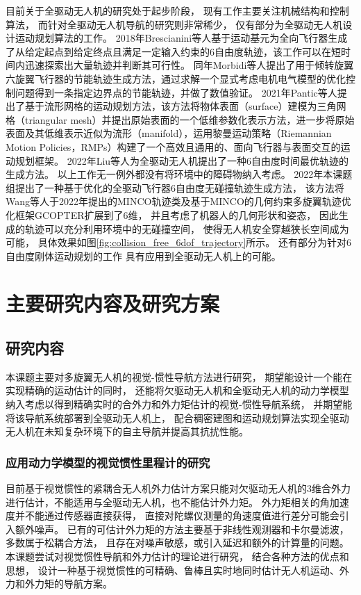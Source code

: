 目前关于全驱动无人机的研究处于起步阶段，
现有工作主要关注机械结构和控制算法，
而针对全驱动无人机导航的研究则非常稀少，
仅有部分为全驱动无人机设计运动规划算法的工作。
2018年Brescianini等人基于运动基元为全向飞行器生成了从给定起点到给定终点且满足一定输入约束的6自由度轨迹\cite{brescianini2018computationally}，该工作可以在短时间内迅速探索出大量轨迹并判断其可行性。
同年Morbidi等人提出了用于倾转旋翼六旋翼飞行器的节能轨迹生成方法\cite{morbidi2018energy}，通过求解一个显式考虑电机电气模型的优化控制问题得到一条指定边界点的节能轨迹，并做了数值验证。
2021年Pantic等人提出了基于流形网格的运动规划方法\cite{pantic2021mesh}，该方法将物体表面（surface）建模为三角网格（triangular mesh）并提出原始表面的一个低维参数化表示方法，进一步将原始表面及其低维表示近似为流形（manifold），运用黎曼运动策略（Riemannian Motion Policies，RMPs）构建了一个高效且通用的、面向飞行器与表面交互的运动规划框架。
2022年Liu等人为全驱动无人机提出了一种6自由度时间最优轨迹的生成方法\cite{liu2022optimal}。
以上工作无一例外都没有将环境中的障碍物纳入考虑。
2022年本课题组提出了一种基于优化的全驱动飞行器6自由度无碰撞轨迹生成方法\cite{liu2022collision}，
该方法将Wang等人于2022年提出的MINCO轨迹类及基于MINCO的几何约束多旋翼轨迹优化框架GCOPTER\cite{wang2022geometrically}扩展到了6维，
并且考虑了机器人的几何形状和姿态，
因此生成的轨迹可以充分利用环境中的无碰撞空间，
使得无人机安全穿越狭长空间成为可能，
具体效果如图\ref{fig:collision_free_6dof_trajectory}所示。
还有部分为针对6自由度刚体运动规划的工作
\cite{nguyen2016time, belta2002svd, belta2002euclidean, bestaoui2003motion, zefran1998generation, watterson2016smooth, jackson2021planning}
具有应用到全驱动无人机上的可能。

\section{主要研究内容及研究方案}
\subsection{研究内容}
本课题主要对多旋翼无人机的视觉-惯性导航方法进行研究，
期望能设计一个能在实现精确的运动估计的同时，
还能将欠驱动无人机和全驱动无人机的动力学模型纳入考虑以得到精确实时的合外力和外力矩估计的视觉-惯性导航系统，
并期望能将该导航系统部署到全驱动无人机上，
配合稠密建图和运动规划算法实现全驱动无人机在未知复杂环境下的自主导航并提高其抗扰性能。

\subsubsection{应用动力学模型的视觉惯性里程计的研究}
目前基于视觉惯性的紧耦合无人机外力估计方案只能对欠驱动无人机的3维合外力进行估计，不能适用与全驱动无人机，也不能估计外力矩。
外力矩相关的角加速度并不能通过传感器直接获得，
直接对陀螺仪测量的角速度值进行差分可能会引入额外噪声\cite{邱国鹏2023应用视觉}。
已有的可估计外力矩的方法主要基于非线性观测器和卡尔曼滤波，
多数属于松耦合方法，
且存在对噪声敏感，或引入延迟和额外的计算量的问题。
本课题尝试对视觉惯性导航和外力估计的理论进行研究，
结合各种方法的优点和思想，
设计一种基于视觉惯性的可精确、鲁棒且实时地同时估计无人机运动、外力和外力矩的导航方案。

